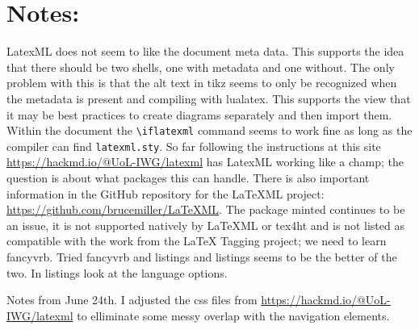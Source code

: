 \documentclass[twoside]{article}
\begin{document}
\section{Notes:}
LatexML does not seem to like the document meta data.  This supports the idea that there should be two shells, one with metadata and one without.  The only problem with this is that the alt text in tikz seems to only be recognized when the metadata is present and compiling with lualatex.  This supports the view that it may be best practices to create diagrams separately and then import them.  Within the document the \verb|\iflatexml| command seems to work fine as long as the compiler can find \verb|latexml.sty|.  So far following the instructions at this site \url{https://hackmd.io/@UoL-IWG/latexml} has LatexML working like a champ; the question is about what packages this can handle.  There is also important information in the GitHub repository for the \LaTeX ML project: \url{https://github.com/brucemiller/LaTeXML}.  The package minted continues to be an issue, it is not supported natively by \LaTeX ML or tex4ht and is not listed as compatible with the work from the \LaTeX\/ Tagging project; we need to learn fancyvrb.  Tried fancyvrb and listings and listings seems to be the better of the two.  In listings look at the language options.

Notes from June 24th.  I adjusted the css files from \url{https://hackmd.io/@UoL-IWG/latexml} to elliminate some messy overlap with the navigation elements.
\end{document}
